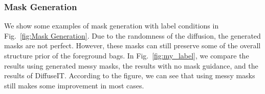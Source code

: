\subsubsection{Mask Generation} 
We show some examples of mask generation with label conditions in Fig.~\ref{fig:Mask Generation}. Due to the randomness of the diffusion, the generated masks are not perfect. However, these masks can still preserve some of the overall structure prior of the foreground bags. In Fig.~\ref{fig:my_label}, we compare the results using generated messy masks, the results with no mask guidance, and the results of DiffuseIT. According to the figure, we can see that using messy masks still makes some improvement in most cases.

